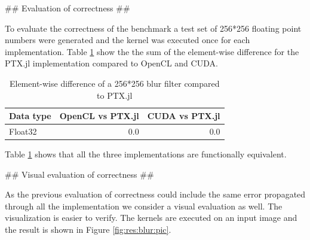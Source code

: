 \begin{markdown}
## Evaluation of correctness ##

To evaluate the correctness of the benchmark a test set of 256*256
floating point numbers were generated and the kernel was executed once
for each implementation. Table \ref{tab:res:blur:diff} show the the
sum of the element-wise difference for the PTX.jl implementation
compared to OpenCL and CUDA.

\begin{table}[H]
  \centering
  \begin{tabular}{|l|r|r|}
    \hline
    Data type & OpenCL vs PTX.jl & CUDA vs PTX.jl \\
    \hline
    Float32  & 0.0 & 0.0 \\
    \hline
  \end{tabular}
  \caption{Element-wise difference of a 256*256 blur filter compared to PTX.jl}
  \label{tab:res:blur:diff}
\end{table}

Table \ref{tab:res:blur:diff} shows that all the three implementations
are functionally equivalent.

## Visual evaluation of correctness ##

As the previous evaluation of correctness could include the same error
propagated through all the implementation we consider a visual
evaluation as well. The visualization is easier to verify. The kernels
are executed on an input image and the result is shown in Figure
\ref{fig:res:blur:pic}.


\end{markdown}

